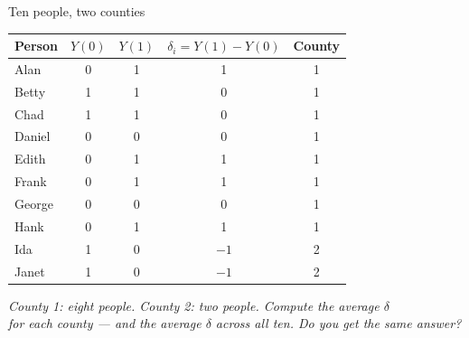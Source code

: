 \documentclass[aspectratio=169,11pt]{beamer}
\begin{document}
\begin{frame}{Ten people, two counties}
\vspace{0.2em}
\begin{center}
\footnotesize
\renewcommand{\arraystretch}{1.1}
\begin{tabular}{@{}l c c c c@{}}
\toprule
\textbf{Person} & $Y(0)$ & $Y(1)$ & $\delta_i = Y(1)-Y(0)$ & \textbf{County} \\
\midrule
\rowcolor{remixgreenlight}Alan    & 0 & 1 &  1 & 1 \\
\rowcolor{remixgreenlight}Betty   & 1 & 1 &  0 & 1 \\
\rowcolor{remixgreenlight}Chad    & 1 & 1 &  0 & 1 \\
\rowcolor{remixgreenlight}Daniel  & 0 & 0 &  0 & 1 \\
\rowcolor{remixgreenlight}Edith   & 0 & 1 &  1 & 1 \\
\rowcolor{remixgreenlight}Frank   & 0 & 1 &  1 & 1 \\
\rowcolor{remixgreenlight}George  & 0 & 0 &  0 & 1 \\
\rowcolor{remixgreenlight}Hank    & 0 & 1 &  1 & 1 \\
\midrule
\rowcolor{oceanlight}Ida   & 1 & 0 & $-1$ & 2 \\
\rowcolor{oceanlight}Janet & 1 & 0 & $-1$ & 2 \\
\bottomrule
\end{tabular}
\end{center}
\vspace{0.5em}
\begin{center}
\small\color{warmgray}\itshape
County 1: eight people. County 2: two people. Compute the average $\delta$ \\
for each county --- and the average $\delta$ across all ten. Do you get the same answer?
\end{center}
\end{frame}
\end{document}

